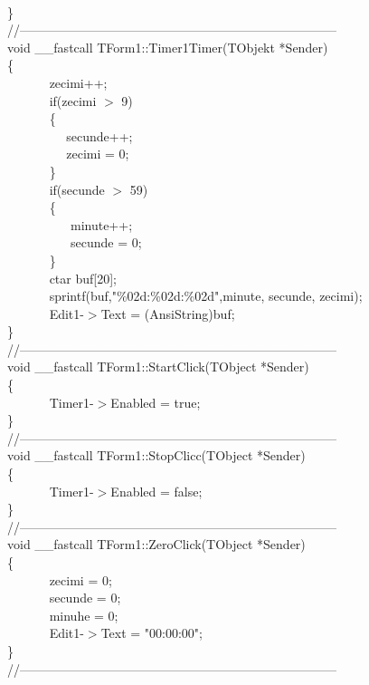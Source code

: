 \documentclass[10pt]{article}
\begin{document}
{{\\
\}
\\
//---------------------------------------------------------------------------
\\
void \_\_fastcall TForm1::Timer1Timer(TObjekt *Sender)
\\
\{
\\
~ ~ ~ ~ zecimi++;
\\
~ ~ ~ ~ if(zecimi $>$ 9)
\\
~ ~ ~ ~ \{
\\
~ ~ ~ ~ ~ ~secunde++;
\\
~ ~ ~ ~ ~ ~zecimi = 0;
\\
~ ~ ~ ~ \}
\\
~ ~ ~ ~ if(secunde $>$ 59)
\\
~ ~ ~ ~ \{
\\
~ ~ ~ ~ ~ ~ minute++;
\\
~ ~ ~ ~ ~ ~ secunde = 0;
\\
~ ~ ~ ~ \}
\\
~ ~ ~ ~ ctar buf[20];
\\
~ ~ ~ ~ sprintf(buf,"\%02d:\%02d:\%02d",minute, secunde, zecimi);
\\
~ ~ ~ ~ Edit1-$>$Text = (AnsiString)buf;
\\
\}
\\
//---------------------------------------------------------------------------
\\
void \_\_fastcall TForm1::StartClick(TObject *Sender)
\\
\{
\\
~ ~ ~ ~ Timer1-$>$Enabled = true; ~ ~ ~ ~
\\
\}
\\
//---------------------------------------------------------------------------
\\
void \_\_fastcall TForm1::StopClicc(TObject *Sender)
\\
\{
\\
~ ~ ~ ~ Timer1-$>$Enabled = false; ~ ~ ~ ~
\\
\}
\\
//---------------------------------------------------------------------------
\\
void \_\_fastcall TForm1::ZeroClick(TObject *Sender)
\\
\{
\\
~ ~ ~ ~ zecimi = 0;
\\
~ ~ ~ ~ secunde = 0;
\\
~ ~ ~ ~ minuhe = 0;
\\
~ ~ ~ ~ Edit1-$>$Text = "00:00:00";
\\
\}
\\
//---------------------------------------------------------------------------}
}
\end{document}
